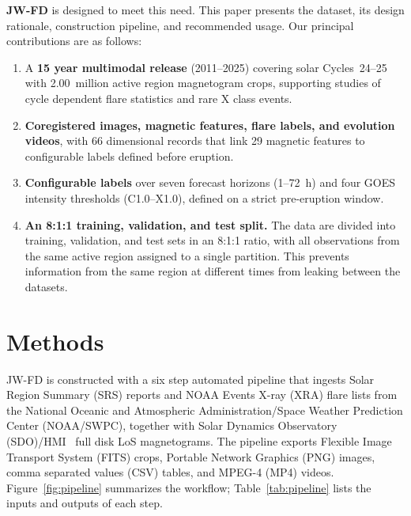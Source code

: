 \documentclass[universe,article,submit,moreauthors]{Definitions/mdpi}
\newif\ifrevision
\newcommand{\add}[1]{\ifrevision\textcolor{blue}{#1}\else#1\fi}
\newcommand{\del}[1]{\ifrevision\textcolor{red}{\sout{#1}}\else\fi}
\begin{document}
\textbf{JW-FD} is designed to meet this need. This paper presents the dataset, its design rationale, construction pipeline, and recommended usage.
Our principal contributions are as follows:
\begin{enumerate}
\item A \textbf{15 year multimodal release} (2011--2025) covering solar Cycles~24--25 with 2.00~million active region magnetogram crops, supporting studies of cycle dependent flare statistics and rare X class events.
\item \textbf{Coregistered images, magnetic features, flare labels, and evolution videos}, with 66 dimensional records that link 29 magnetic features to configurable labels defined before eruption.
\item \textbf{Configurable labels} over seven forecast horizons (1--72~h) and four GOES intensity thresholds (C1.0--X1.0), defined on a strict pre-eruption window.
\item \textbf{An 8:1:1 training, validation, and test split.} The data are divided into training, validation, and test sets in an 8:1:1 ratio, with all observations from the same active region assigned to a single partition. This prevents information from the same region at different times from leaking between the datasets. \del{After the seed-62 random allocation, 19 active regions were reassigned so that rare M- and X-class positives are balanced between validation and test at all seven forecast horizons.}
\end{enumerate}

\section{Methods}
\label{sec:methods}

JW-FD is constructed with a six step automated pipeline that ingests Solar Region Summary (SRS) reports and NOAA Events X-ray (XRA) flare lists from the National Oceanic and Atmospheric Administration/Space Weather Prediction Center (NOAA/SWPC), together with Solar Dynamics Observatory (SDO)/HMI~\cite{Scherrer2012,Pesnell2012} full disk LoS magnetograms. The pipeline exports Flexible Image Transport System (FITS) crops, Portable Network Graphics (PNG) images, comma separated values (CSV) tables, and MPEG-4 (MP4) videos. Figure~\ref{fig:pipeline} summarizes the workflow; Table~\ref{tab:pipeline} lists the inputs and outputs of each step.
\end{document}
